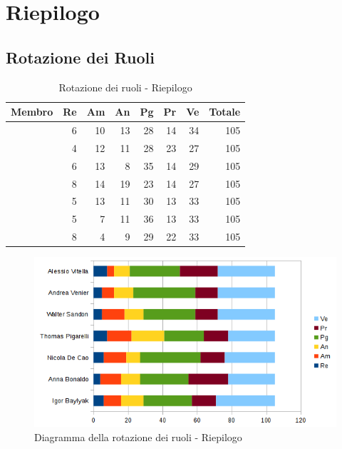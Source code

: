 \documentclass[12pt,a4paper]{article}
\begin{document}
\section{Riepilogo}
\subsection{Rotazione dei Ruoli}

\begin{table}[h]
	\begin{center}
		\begin{tabular}{l r r r r r r r}
			\toprule
			\textbf{Membro}	&	\textbf{Re}	&	\textbf{Am}	& \textbf{An} & \textbf{Pg} & \textbf{Pr} & \textbf{Ve} & \textbf{Totale}\\
			\midrule
			\midrule
			\IB & 6 & 10 & 13 & 28 & 14 & 34 & 105 \\
			\midrule
			\AB & 4 & 12 & 11 & 28 & 23 & 27 & 105 \\
			\midrule
			\NDC & 6 & 13 & 8 & 35 & 14 & 29 & 105 \\
			\midrule
			\TP & 8 & 14 & 19 & 23 & 14 & 27 & 105 \\
			\midrule
			\WS & 5 & 13 & 11 & 30 & 13 & 33 & 105 \\
			\midrule
			\AVE & 5 & 7 & 11 & 36 & 13 & 33 & 105 \\
			\midrule
			\AVI & 8 & 4 & 9 & 29 & 22 & 33 & 105 \\
			\bottomrule
		\end{tabular}
		\caption{Rotazione dei ruoli - Riepilogo}
	\end{center}
\end{table}

\begin{center}
	\begin{figure}[H]
		\centering		\includegraphics[width=\textwidth]{diagrammaBarreRiepilogoRotazioneRuoli.png}
		\caption{Diagramma della rotazione dei ruoli - Riepilogo}
	\end{figure}
\end{center}
\end{document}
